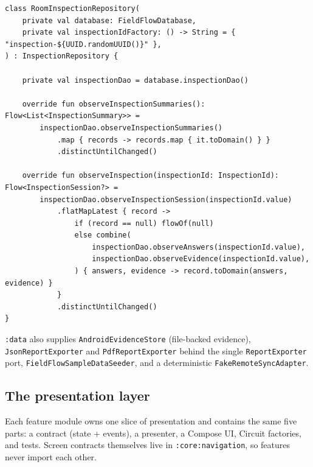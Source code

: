 \documentclass[11pt,a4paper]{article}
\newcommand{\mdl}[1]{\texttt{#1}}
\newcommand{\file}[1]{{\small\texttt{#1}}}
\begin{document}
\begin{lstlisting}[caption={\file{data/.../RoomInspectionRepository.kt} (abridged)
--- the adapter composes DAO flows and maps records to domain models. The class
implements a domain interface, which is what makes the dependency point inward.}]
class RoomInspectionRepository(
    private val database: FieldFlowDatabase,
    private val inspectionIdFactory: () -> String = { "inspection-${UUID.randomUUID()}" },
) : InspectionRepository {

    private val inspectionDao = database.inspectionDao()

    override fun observeInspectionSummaries(): Flow<List<InspectionSummary>> =
        inspectionDao.observeInspectionSummaries()
            .map { records -> records.map { it.toDomain() } }
            .distinctUntilChanged()

    override fun observeInspection(inspectionId: InspectionId): Flow<InspectionSession?> =
        inspectionDao.observeInspectionSession(inspectionId.value)
            .flatMapLatest { record ->
                if (record == null) flowOf(null)
                else combine(
                    inspectionDao.observeAnswers(inspectionId.value),
                    inspectionDao.observeEvidence(inspectionId.value),
                ) { answers, evidence -> record.toDomain(answers, evidence) }
            }
            .distinctUntilChanged()
}
\end{lstlisting}

\mdl{:data} also supplies \file{AndroidEvidenceStore} (file-backed evidence),
\file{JsonReportExporter} and \file{PdfReportExporter} behind the single
\file{ReportExporter} port, \file{FieldFlowSampleDataSeeder}, and a deterministic
\file{FakeRemoteSyncAdapter}.

\subsection{The presentation layer}

Each feature module owns one slice of presentation and contains the same five
parts: a contract (state + events), a presenter, a Compose UI, Circuit
factories, and tests. Screen contracts themselves live in
\mdl{:core:navigation}, so features never import each other.
\end{document}
